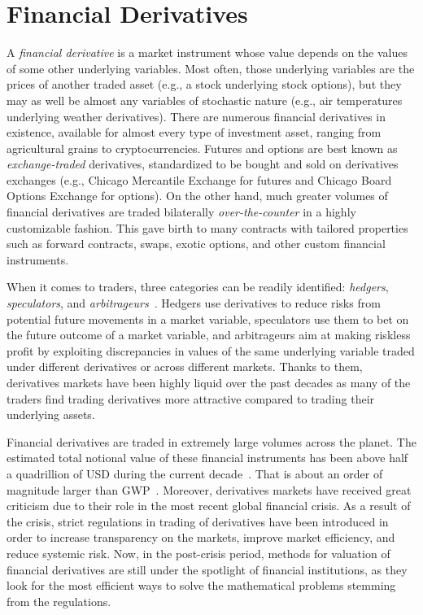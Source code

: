 \documentclass{UUThesisTemplate}
\begin{document}
%
\chapter{Financial Derivatives}
\label{ch:finder}

\par
A \emph{financial derivative} is a market instrument whose value depends on the values of some other underlying variables. Most often, those underlying variables are the prices of another traded asset (e.g., a stock underlying stock options), but they may as well be almost any variables of stochastic nature (e.g., air temperatures underlying weather derivatives). There are numerous financial derivatives in existence, available for almost every type of investment asset, ranging from agricultural grains to cryptocurrencies. Futures and options are best known as \emph{exchange-traded} derivatives, standardized to be bought and sold on derivatives exchanges (e.g., Chicago Mercantile Exchange for futures and Chicago Board Options Exchange for options). On the other hand, much greater volumes of financial derivatives are traded bilaterally \emph{over-the-counter} in a highly customizable fashion. This gave birth to many contracts with tailored properties such as forward contracts, swaps, exotic options, and other custom financial instruments.

\par
When it comes to traders, three categories can be readily identified: \emph{hedgers}, \emph{speculators}, and \emph{arbitrageurs}~\cite{hull2017options}. Hedgers use derivatives to reduce risks from potential future movements in a market variable, speculators use them to bet on the future outcome of a market variable, and arbitrageurs aim at making riskless profit by exploiting discrepancies in values of the same underlying variable traded under different derivatives or across different markets. Thanks to them, derivatives markets have been highly liquid over the past decades as many of the traders find trading derivatives more attractive compared to trading their underlying assets.

\par
Financial derivatives are traded in extremely large volumes across the planet. %
The estimated total notional value of these financial instruments has been above half a quadrillion of USD during the current decade~\cite{bank2018annual}. That is about an order of magnitude larger than GWP~\cite{worldgdp2018annual}. Moreover, derivatives markets have received great criticism due to their role in the most recent global financial crisis.  As a result of the crisis, strict regulations in trading of derivatives have been introduced in order to increase transparency on the markets, improve market efficiency, and reduce systemic risk. Now, in the post-crisis period, methods for valuation of financial derivatives are still under the spotlight of financial institutions, as they look for the most efficient ways to solve the mathematical problems stemming from the regulations.
\end{document}
